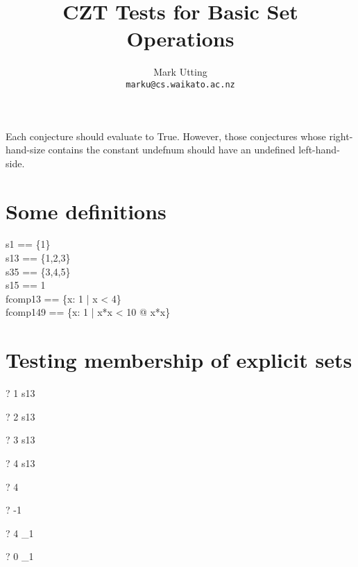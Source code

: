 \documentclass{article}
\title{CZT Tests for Basic Set Operations}
\author{Mark Utting \\ \texttt{marku@cs.waikato.ac.nz}}
\newcommand{\negate}{-}
\begin{document}
\maketitle

Each conjecture should evaluate to True.
However, those conjectures whose right-hand-size contains
the constant undefnum should have an undefined left-hand-side.


\section{Some definitions}

\begin{zed}
s1  == \{1\} \\
s13 == \{1,2,3\} \\
s35 == \{3,4,5\} \\
s15 == 1  \\
fcomp13 == \{x: 1  | x < 4\} \\
fcomp149 == \{x: 1  | x*x < 10 @ x*x\}
\end{zed}


\section{Testing membership of explicit sets}
\begin{zed} \vdash?  1  \in s13 \end{zed}
\begin{zed} \vdash?  2  \in s13 \end{zed}
\begin{zed} \vdash?  3  \in s13 \end{zed}
\begin{zed} \vdash?  4  \notin s13 \end{zed}
\begin{zed} \vdash?  4  \in \nat \end{zed}
\begin{zed} \vdash?  \negate 1 \notin \nat \end{zed}
\begin{zed} \vdash?  4  \in \nat_1 \end{zed}
\begin{zed} \vdash?  0  \notin \nat_1 \end{zed}
\end{document}
